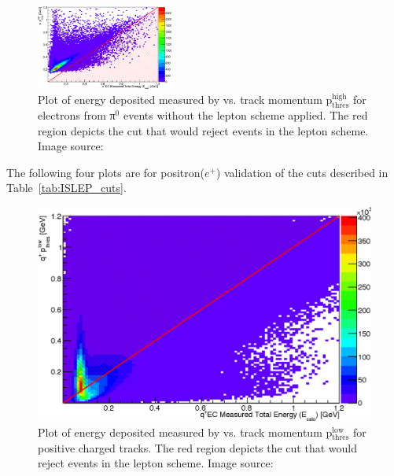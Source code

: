 \begin{figure}\begin{center}
\includegraphics[width=0.4\textwidth]{figures/lepton/Pim_EChighcut.eps}
\caption[ Deposited Energy Comparison to Track Momentum for e$^-$ from π$^0$ Events]{\label{fig:islep.pimECcut}Plot of energy deposited measured by  vs. track momentum p$\mathrm{_{thres}^{high}}$ for electrons from π$^0$ events without the  lepton   scheme applied. The red region depicts the cut that would reject events in the  lepton   scheme. Image source:~\cite{clas.thesis.kunkel}}
\end{center}\end{figure}
\FloatBarrier
The following four plots are for positron($e^+$)  validation of the  
cuts described in Table~\ref{tab:ISLEP_cuts}.
%
%
%
%
\begin{figure}\begin{center}
\includegraphics[width=0.45\columnwidth]{figures/lepton/Pip_EClow.eps}
\caption[ Deposited Energy Comparison to Lower Threshold Track Momentum for q$^+$ Tracks]{\label{fig:islep.pipEClow}Plot of energy deposited measured by  vs. track momentum p$\mathrm{_{thres}^{low}}$ for positive charged tracks. The red region depicts the cut that would reject events in the  lepton   scheme. Image source:~\cite{clas.thesis.kunkel}}
\end{center}\end{figure}

